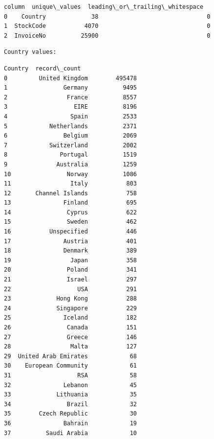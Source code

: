 \documentclass[11pt]{article}
\begin{document}
    
    \begin{Verbatim}[commandchars=\\\{\}]
      column  unique\_values  leading\_or\_trailing\_whitespace
0    Country             38                               0
1  StockCode           4070                               0
2  InvoiceNo          25900                               0
    \end{Verbatim}

    
    \begin{Verbatim}[commandchars=\\\{\}]
Country values:
    \end{Verbatim}

    
    \begin{Verbatim}[commandchars=\\\{\}]
                 Country  record\_count
0         United Kingdom        495478
1                Germany          9495
2                 France          8557
3                   EIRE          8196
4                  Spain          2533
5            Netherlands          2371
6                Belgium          2069
7            Switzerland          2002
8               Portugal          1519
9              Australia          1259
10                Norway          1086
11                 Italy           803
12       Channel Islands           758
13               Finland           695
14                Cyprus           622
15                Sweden           462
16           Unspecified           446
17               Austria           401
18               Denmark           389
19                 Japan           358
20                Poland           341
21                Israel           297
22                   USA           291
23             Hong Kong           288
24             Singapore           229
25               Iceland           182
26                Canada           151
27                Greece           146
28                 Malta           127
29  United Arab Emirates            68
30    European Community            61
31                   RSA            58
32               Lebanon            45
33             Lithuania            35
34                Brazil            32
35        Czech Republic            30
36               Bahrain            19
37          Saudi Arabia            10
    \end{Verbatim}
\end{document}
